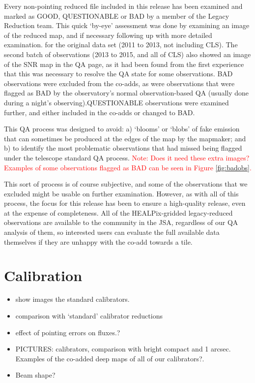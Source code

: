 \documentclass[twocolumn,times]{aastex6}
\newcommand{\note}[1]{\textcolor{red}{Note: #1}}
\newcommand{\status}[1]{\textsf{#1}}
\begin{document}
Every non-pointing reduced file included in this release has been
examined and marked as \status{GOOD}, \status{QUESTIONABLE} or
\status{BAD} by a member of the Legacy Reduction team. This quick
`by-eye' assessment was done by examining an image of the reduced map,
and if necessary following up with more detailed examination. for the
original data set (2011 to 2013, not including CLS). The second batch
of observations (2013 to 2015, and all of CLS) also showed an image of
the SNR map in the QA page, as it had been found from the first
experience that this was necessary to resolve the QA state for some
observations. \status{BAD} observations were excluded from the co-adds,
as were observations that were flagged as \status{BAD} by the
observatory's normal observation-based QA (usually done during a
night's observing).\status{QUESTIONABLE} observations were examined
further, and either included in the co-adds or changed to \status{BAD}.


This QA process was designed to avoid: a) `blooms' or `blobs' of fake
emission that can sometimes be produced at the edges of the map by the
mapmaker; and b) to identify the most problematic observations that
had missed being flagged under the telescope standard QA
process. \note{Does it need these extra images? Examples of some
  observations flagged as BAD can be seen in Figure \ref{fig:badobs}.}

This sort of process is of course subjective, and some of the
observations that we excluded might be usable on further
examination. However, as with all of this process, the focus for this
release has been to ensure a high-quality release, even at the expense
of completeness. All of the HEALPix-gridded legacy-reduced
observations are available to the community in the JSA, regardless of
our QA analysis of them, so interested users can evaluate the full
available data themselves if they are unhappy with the co-add towards a
tile.


\section{Calibration}
\label{sec:calib}


\begin{itemize}
\item show images the standard calibrators.
\item comparison with `standard' calibrator reductions
\item effect of pointing errors on fluxes.?
\item PICTURES: calibrators, comparison with bright compact and 1
  arcsec. Examples of the co-added deep maps of all of our
  calibrators?.
\item Beam shape?
\end{itemize}
\end{document}
